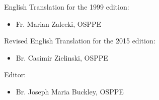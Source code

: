 English Translation for the 1999 edition:
\begin{itemize}
\item Fr. Marian Zalecki, OSPPE
\end{itemize}
\medbreak

Revised English Translation for the 2015 edition:
\begin{itemize}
\item Br. Casimir Zielinski, OSPPE
\end{itemize}
\medbreak

Editor:
\begin{itemize}
\item Br. Joseph Maria Buckley, OSPPE
\end{itemize}

\vfill

\pagebreak
